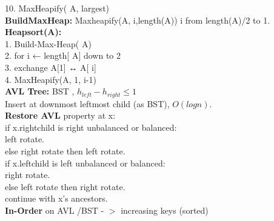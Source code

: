 \documentclass[paper=a4, fontsize=10pt]{scrartcl} %
\begin{document}
10. \indent MaxHeapify( A, largest)\\
\textbf{BuildMaxHeap:} Maxheapify(A, i,length(A)) i from length(A)/2 to 1.\\
\textbf{Heapsort(A):}\\
1. Build-Max-Heap( A)\\
2. for i ← length[ A] down to 2\\
3. \indent exchange A[1] ↔ A[ i]\\
4. \indent MaxHeapify(A, 1, i-1)\\
\textbf{AVL Tree: }BST , $h_{left} - h_{right} \leq 1$\\
Insert at downmost leftmost child (as BST), $O(log n)$.\\
\textbf{Restore AVL }property at x: \\
if x.rightchild is right unbalanced or balanced: \\
\indent left rotate. \\
\indent else right rotate then left rotate.\\
if x.leftchild is left unbalanced or balanced: \\
\indent right rotate. \\
\indent else left rotate then right rotate.\\
continue with x's ancestors.\\
\textbf{In-Order} on AVL /BST - $>$ increasing keys (sorted)\\
\end{document}
